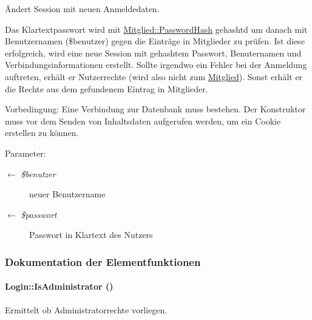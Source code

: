 Ändert Session mit neuen Anmeldedaten. 

Das Klartextpasswort wird mit \hyperlink{classMitglied_9b13db80866c22bf992e73f2eb75e369}{Mitglied::Password\-Hash} gehashtd um danach mit Benutzernamen (\$benutzer) gegen die Einträge in Mitglieder zu prüfen. Ist diese erfolgreich, wird eine neue Session mit gehashtem Passwort, Benuternamen und Verbindungsinformationen erstellt. Sollte irgendwo ein Fehler bei der Anmeldung auftreten, erhält er Nutzerrechte (wird also nicht zum \hyperlink{classMitglied}{Mitglied}). Sonst erhält er die Rechte aus dem gefundenem Eintrag in Mitglieder. \begin{Desc}
\item[Vorbedingung:]Eine Verbindung zur Datenbank muss bestehen. Der Konstruktor muss vor dem Senden von Inhaltsdaten aufgerufen werden, um ein Cookie erstellen zu können. \end{Desc}
\begin{Desc}
\item[Parameter:]
\begin{description}
\item[\mbox{$\leftarrow$} {\em \$benutzer}]neuer Benutzername \item[\mbox{$\leftarrow$} {\em \$passwort}]Passwort in Klartext des Nutzers \end{description}
\end{Desc}


\subsubsection{Dokumentation der Elementfunktionen}
\hypertarget{classLogin_6c120224aa6719f58c6ccd08acc28758}{
\paragraph[IsAdministrator]{\setlength{\rightskip}{0pt plus 5cm}Login::Is\-Administrator ()}\hfill}
\label{classLogin_6c120224aa6719f58c6ccd08acc28758}


Ermittelt ob Administratorrechte vorliegen. 

